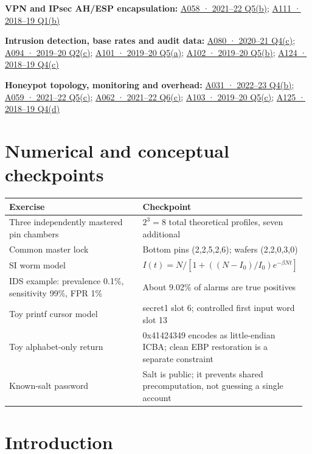 \documentclass[11pt,a4paper]{article}
\begin{document}
\textbf{VPN and IPsec AH/\allowbreak{}ESP encapsulation:} \hyperref[a058]{A058 · 2021–22 Q5(b)}; \hyperref[a111]{A111 · 2018–19 Q1(b)}


\textbf{Intrusion detection,\allowbreak{} base rates and audit data:} \hyperref[a080]{A080 · 2020–21 Q4(c)}; \hyperref[a094]{A094 · 2019–20 Q2(c)}; \hyperref[a101]{A101 · 2019–20 Q5(a)}; \hyperref[a102]{A102 · 2019–20 Q5(b)}; \hyperref[a124]{A124 · 2018–19 Q4(c)}


\textbf{Honeypot topology,\allowbreak{} monitoring and overhead:} \hyperref[a031]{A031 · 2022–23 Q4(b)}; \hyperref[a059]{A059 · 2021–22 Q5(c)}; \hyperref[a062]{A062 · 2021–22 Q6(c)}; \hyperref[a103]{A103 · 2019–20 Q5(c)}; \hyperref[a125]{A125 · 2018–19 Q4(d)}



\clearpage
\section{Numerical and conceptual checkpoints}


{\small\setlength{\tabcolsep}{3pt}
\begin{longtable}{>{\raggedright\arraybackslash}p{0.46070\linewidth}>{\raggedright\arraybackslash}p{0.51019\linewidth}}
\toprule
\textbf{Exercise} & \textbf{Checkpoint} \\
\midrule
\endhead
Three independently mastered pin chambers & \(2^3=8\) total theoretical profiles,\allowbreak{} seven additional \\
Common master lock & Bottom pins (2,\allowbreak{}2,\allowbreak{}5,\allowbreak{}2,\allowbreak{}6); wafers (2,\allowbreak{}2,\allowbreak{}0,\allowbreak{}3,\allowbreak{}0) \\
SI worm model & \(I(t)=N/[1+((N-I_0)/I_0)e^{-\beta Nt}]\) \\
IDS example: prevalence 0.1\%,\allowbreak{} sensitivity 99\%,\allowbreak{} FPR 1\% & About 9.02\% of alarms are true positives \\
Toy printf cursor model & secret1 slot 6; controlled first input word slot 13 \\
Toy alphabet-only return & 0x41424349 encodes as little-endian ICBA; clean EBP restoration is a separate constraint \\
Known-salt password & Salt is public; it prevents shared precomputation,\allowbreak{} not guessing a single account \\
\bottomrule
\end{longtable}
}


\clearpage
\section{Introduction}
\end{document}
